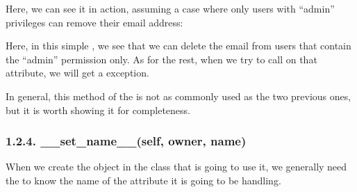\documentclass[a4paper,10pt,english]{sphinxmanual}
\begin{document}
Here, we can see it in action, assuming a case where only users with “admin” privileges
can remove their email address:

\begin{sphinxVerbatim}[commandchars=\\\{\}]
    \PYG{p}{[}\PYG{p}{]}
    \PYG{p}{[} \PYG{p}{]}
 
  
  
 
\end{sphinxVerbatim}

Here, in this simple , we see that we can delete the email from users that
contain the “admin” permission only. As for the rest, when we try to call  on that
attribute, we will get a  exception.

In general, this method of the  is not as commonly used as the two previous ones,
but it is worth showing it for completeness.


\subsubsection{1.2.4. \_\_set\_name\_\_(self, owner, name)}
\label{\detokenize{chapters/6_descriptors/index:set-name-self-owner-name}}
When we create the  object in the class that is going to use it, we generally
need the  to know the name of the attribute it is going to be handling.
\end{document}
